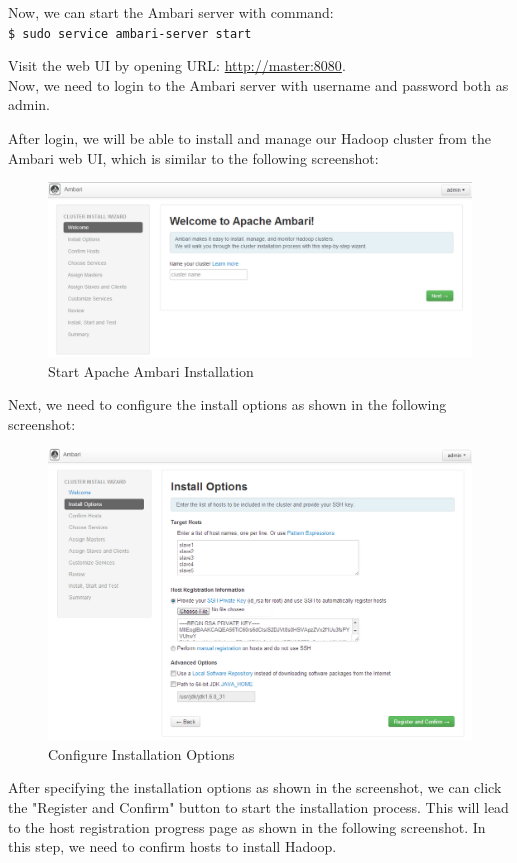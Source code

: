 Now, we can start the Ambari server with command: \\
\verb|$ sudo service ambari-server start|

Visit the web UI by opening URL: \url{http://master:8080}. \\
Now, we need to login to the Ambari server with username and password both as admin.

After login, we will be able to install and manage our Hadoop cluster from the Ambari web UI, which is similar to the following screenshot:
\begin{figure}[ht]
  \centering
  \includegraphics[width=.8\textwidth]{figs/5163os_06_14.png}
  \caption{Start Apache Ambari Installation}\label{fig:ambari.welcome}
\end{figure} 
Next, we need to configure the install options as shown in the following screenshot:
\begin{figure}[ht]
  \centering
  \includegraphics[width=.8\textwidth]{figs/5163os_06_15.png}
  \caption{Configure Installation Options}\label{fig:ambari.install.options}
\end{figure} 
After specifying the installation options as shown in the screenshot, we can click the "Register and Confirm" button to start the installation process.  This will lead to the host registration progress page as shown in the following screenshot. In this step, we need to confirm hosts to install Hadoop.
